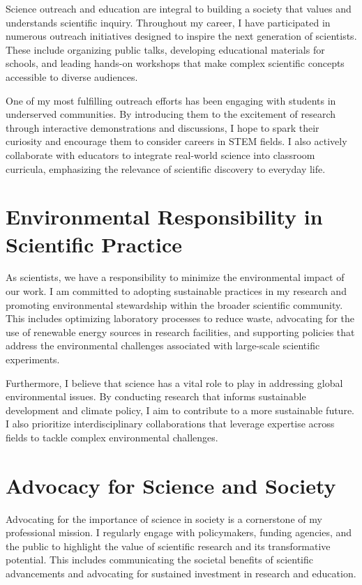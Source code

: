 {\begin{flushleft}
Science outreach and education are integral to building a society that values and understands scientific inquiry. Throughout my career, I have participated in numerous outreach initiatives designed to inspire the next generation of scientists. These include organizing public talks, developing educational materials for schools, and leading hands-on workshops that make complex scientific concepts accessible to diverse audiences.

One of my most fulfilling outreach efforts has been engaging with students in underserved communities. By introducing them to the excitement of research through interactive demonstrations and discussions, I hope to spark their curiosity and encourage them to consider careers in STEM fields. I also actively collaborate with educators to integrate real-world science into classroom curricula, emphasizing the relevance of scientific discovery to everyday life.

\vspace{\baselineskip}
\section{Environmental Responsibility in Scientific Practice}

As scientists, we have a responsibility to minimize the environmental impact of our work. I am committed to adopting sustainable practices in my research and promoting environmental stewardship within the broader scientific community. This includes optimizing laboratory processes to reduce waste, advocating for the use of renewable energy sources in research facilities, and supporting policies that address the environmental challenges associated with large-scale scientific experiments.

Furthermore, I believe that science has a vital role to play in addressing global environmental issues. By conducting research that informs sustainable development and climate policy, I aim to contribute to a more sustainable future. I also prioritize interdisciplinary collaborations that leverage expertise across fields to tackle complex environmental challenges.

\vspace{\baselineskip}
\section{Advocacy for Science and Society}

Advocating for the importance of science in society is a cornerstone of my professional mission. I regularly engage with policymakers, funding agencies, and the public to highlight the value of scientific research and its transformative potential. This includes communicating the societal benefits of scientific advancements and advocating for sustained investment in research and education.


\end{flushleft}}
